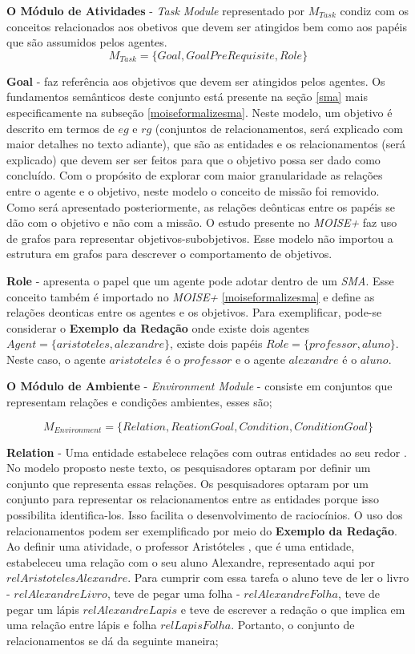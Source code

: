 \textbf{O Módulo de Atividades} - \textit{Task Module} representado por $M_{Task}$ condiz com os conceitos relacionados aos obetivos que devem ser atingidos bem como aos papéis que são assumidos pelos agentes.
\begin{equation}
    M_{Task} = \{ Goal, GoalPreRequisite, Role \}
\end{equation}

\textbf{Goal} - faz referência aos objetivos que devem ser atingidos pelos agentes. Os fundamentos semânticos deste conjunto está presente na seção \ref{sma} mais especificamente na subseção \ref{moiseformalizesma}. Neste modelo, um objetivo é descrito em termos de $eg$ e $rg$ (conjuntos de relacionamentos, será explicado com maior detalhes no texto adiante), que são as entidades e os relacionamentos (será explicado) que devem ser ser feitos para que o objetivo possa ser dado como concluído. Com o propósito de explorar com maior granularidade as relações entre o agente e o objetivo, neste modelo o conceito de missão foi removido. Como será apresentado posteriormente, as relações deônticas entre os papéis se dão com o objetivo e não com a missão. O estudo presente no \textit{MOISE+} faz uso de grafos para representar objetivos-subobjetivos. Esse modelo não importou a estrutura em grafos para descrever o comportamento de objetivos. 

\textbf{Role} - apresenta o papel que um agente pode adotar dentro de um \textit{SMA}. Esse conceito também é importado no \textit{MOISE+} 
\ref{moiseformalizesma} e define as relações deonticas entre os agentes e os objetivos. Para exemplificar, pode-se considerar o \textbf{Exemplo da Redação} onde existe dois agentes $Agent = \{ aristoteles, alexandre \}$, existe dois papéis $Role = \{ professor, aluno\}$. Neste caso, o agente $aristoteles$ é o $professor$ e o agente $alexandre$ é o $aluno$.

\textbf{O Módulo de Ambiente} - \textit{Environment Module} - consiste em conjuntos que representam relações e condições ambientes, esses são;

\begin{equation}
    M_{Environment} = \{ Relation, ReationGoal, Condition, ConditionGoal \}
\end{equation}

\textbf{Relation} - Uma entidade estabelece relações com outras entidades ao seu redor \cite{entity}. No modelo proposto neste texto, 
os pesquisadores optaram por definir um conjunto que representa essas relações. Os pesquisadores optaram por um conjunto para representar
os relacionamentos entre as entidades porque isso possibilita identifica-los. Isso facilita o desenvolvimento de raciocínios. O uso 
dos relacionamentos podem ser exemplificado por meio do \textbf{Exemplo da Redação}. Ao definir uma atividade, o professor Aristóteles
, que é uma entidade, estabeleceu uma relação com o seu aluno Alexandre, representado aqui por $relAristotelesAlexandre$. Para cumprir com essa tarefa o aluno teve de ler o livro - $relAlexandreLivro$, teve de pegar uma folha - $relAlexandreFolha$, teve de pegar um lápis $relAlexandreLapis$ e teve de escrever a redação o que implica em uma relação entre lápis e folha $relLapisFolha$. Portanto, o conjunto de relacionamentos se dá da seguinte maneira;

